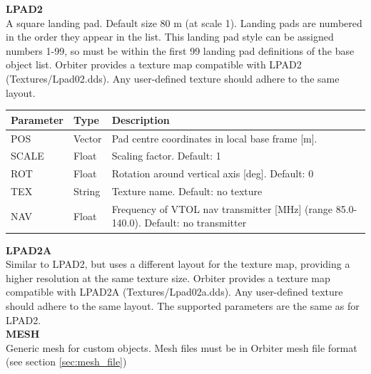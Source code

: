 \documentclass[Orbiter Developer Manual.tex]{subfiles}
\begin{document}
\noindent
\textbf{LPAD2}\\
A square landing pad. Default size 80 m (at scale 1). Landing pads are numbered in the order they appear in the list. This landing pad style can be assigned numbers 1-99, so must be within the first 99 landing pad definitions of the base object list. Orbiter provides a texture map compatible with LPAD2 (Textures/Lpad02.dds). Any user-defined texture should adhere to the same layout.

	\begin{longtable}{ |p{}|p{}|p{}| }
	\hline\rule{0pt}{2ex}
	\textbf{Parameter} & \textbf{Type} & \textbf{Description}\\
	\hline\rule{0pt}{2ex}
	POS & Vector & Pad centre coordinates in local base frame [m].\\
	\hline\rule{0pt}{2ex}
	SCALE & Float & Scaling factor. Default: 1\\
	\hline\rule{0pt}{2ex}
	ROT & Float & Rotation around vertical axis [deg]. Default: 0\\
	\hline\rule{0pt}{2ex}
	TEX & String & Texture name. Default: no texture\\
	\hline\rule{0pt}{2ex}
	NAV & Float & Frequency of VTOL nav transmitter [MHz] (range 85.0-140.0). Default: no transmitter\\
	\hline
	\end{longtable}

\noindent
\textbf{LPAD2A}\\
Similar to LPAD2, but uses a different layout for the texture map, providing a higher resolution at the same texture size. Orbiter provides a texture map compatible with LPAD2A (Textures/Lpad02a.dds). Any user-defined texture should adhere to the same layout. The supported parameters are the same as for LPAD2.\\


\noindent
\textbf{MESH}\\
Generic mesh for custom objects. Mesh files must be in Orbiter mesh file format (see section \ref{sec:mesh_file})
\end{document}
